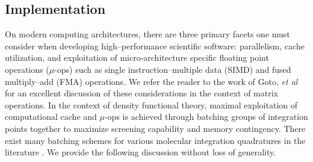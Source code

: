 \subsection{Implementation}
\label{sec:NCDFT_IMPL}

On modern computing architectures, there are three primary facets one must consider when developing high--performance
scientific software: parallelism, cache utilization, and exploitation of micro-architecture specific floating point
operations ($\mu$-ops) such as single instruction--multiple data (SIMD) and fused multiply--add (FMA) operations. 
We refer the reader to the work of Goto, \emph{et al} \cite{Goto08_TOMS12} for an excellent discussion of these considerations in the context of matrix operations.
In the context of density functional theory, maximal exploitation of computational cache
and $\mu$-ops is achieved through batching groups of integration points together to maximize screening capability and
memory contingency. 
There exist many batching schemes for various molecular integration quadratures in the 
literature \cite{Becke88_2547,Jackson90_7453,Laming93_997,Johnson95_169,Frisch96_213,Reveles04_681,Sierka11_3097}.
We provide the following discussion without loss of generality.

